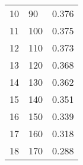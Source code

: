 \documentclass[11pt,a4paper]{article}
\begin{document}
\begin{table}[]
\begin{tabular}{@{}lll@{}}
10                        & 90                                                                                        & 0.376                                                                       \\
11                        & 100                                                                                       & 0.375                                                                       \\
12                        & 110                                                                                       & 0.373                                                                       \\
13                        & 120                                                                                       & 0.368                                                                       \\
14                        & 130                                                                                       & 0.362                                                                       \\
15                        & 140                                                                                       & 0.351                                                                       \\
16                        & 150                                                                                       & 0.339                                                                       \\
17                        & 160                                                                                       & 0.318                                                                       \\
18                        & 170                                                                                       & 0.288                                                                       \\ \bottomrule
\end{tabular}
\end{table}


\end{document}
